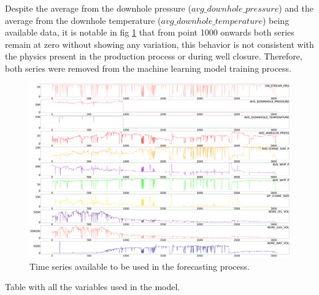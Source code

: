Despite the average from the downhole pressure (\emph{$avg\_downhole\_pressure$}) and the average from the downhole temperature (\emph{$avg\_downhole\_temperature$}) being available data, it is notable in fig \ref{fig:all_features} that from point 1000 onwards both series remain at zero without showing any variation, this behavior is not consistent with the physics present in the production process or during well closure. Therefore, both series were removed from the machine learning model training process.





\begin{figure}[h!]
    \centering
    \includegraphics[width=1.0\textwidth]{images/Features3.png}
    \caption{Time series available to be used in the forecasting process.}
    \label{fig:all_features}
\end{figure}


Table with all the variables used in the model.

